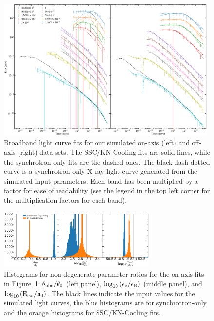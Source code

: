 \documentclass[fleqn,usenatbib]{mnras}
\begin{document}
\begin{figure}
    \centering
    \includegraphics[width=0.98\textwidth]{images/on-axis-fit.png}
    \caption{Broadband light curve fits for our simulated on-axis (left) and off-axis (right) data sets. The SSC/KN-Cooling fits are solid lines, while the synchrotron-only fits are the dashed ones. The black dash-dotted curve is a synchrotron-only X-ray light curve generated from the simulated input parameters. Each band has been multiplied by a factor for ease of readability (see the legend in the top left corner for the multiplication factors for each band).}
    \label{fig:on_fits}
\end{figure}

\begin{figure}
    \centering
    \includegraphics[width=0.7\textwidth]{images/combo_rat.png}
    \caption{Histograms for non-degenerate parameter ratios for the on-axis fits in Figure~\ref{fig:on_fits}: $\theta_{\rm obs}/\theta_{0}$ (left panel), $\log_{10}\left(\epsilon_{\rm e}/\epsilon_{\rm B}\right)$ (middle panel), and $\log_{10}\left(\rm{E}_{\text{iso}}/n_{0}\right)$. The black lines indicate the input values for the simulated light curves, the blue histograms are for synchrotron-only and the orange histograms for SSC/KN-Cooling fits.}
    \label{fig:logeeeb}
\end{figure}
\end{document}

